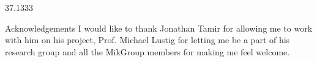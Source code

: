 \documentclass[t]{beamer}
\newcommand{\colwidth}{37.1333}
\begin{document}
{\begin{textblock}{\colwidth}
\begin{frame}
  \begin{block}{Acknowledgements}
  I would like to thank Jonathan Tamir for allowing me to work with him on his project, Prof. Michael Lustig for letting me be a part of his research group and all the MikGroup members for making me feel welcome.
  \end{block}
  \end{frame}
\end{textblock}
}
  
\end{document}
